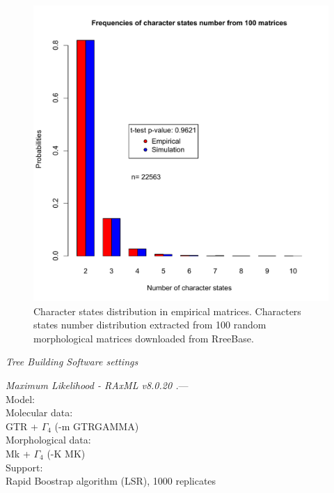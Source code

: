 \documentclass[12pt,letterpaper]{article}
\renewcommand{\subsection}[1]{%
\bigskip
\begin{center}
\begin{large}
\normalfont\itshape #1
\end{large}
\end{center}}
\renewcommand{\subsubsection}[1]{%
\vspace{2ex}
\noindent
\textit{#1.}---}
\begin{document}
\begin{figure}
\centering
\includegraphics[keepaspectratio=true]{Figures/TEM_Fig-AppendixCharacters.pdf}
\caption{Character states distribution in empirical matrices. %
Characters states number distribution extracted from 100 random morphological matrices downloaded from RreeBase.}
\label{Fig_AppendixCharacters}
\end{figure}

\subsection{Tree Building Software settings}

\subsubsection{Maximum Likelihood - RAxML v8.0.20 \citep{Stamatakis21012014}} \\
Model: \\
Molecular data: \\
GTR + $\Gamma_4$ (-m GTRGAMMA) \\
Morphological data: \\
Mk + $\Gamma_4$ (-K MK) \\
Support: \\
Rapid Boostrap algorithm (LSR), 1000 replicates \\
\end{document}
